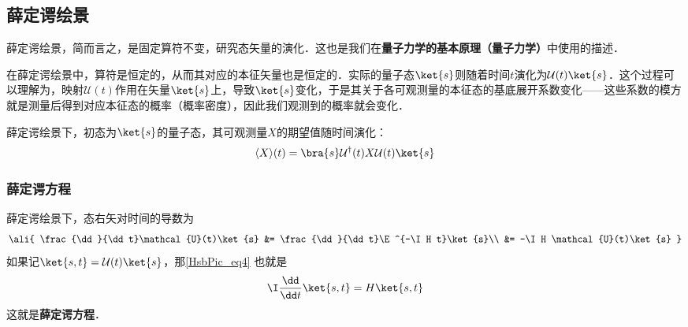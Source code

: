 
\subsection{薛定谔绘景}

薛定谔绘景，简而言之，是固定算符不变，研究态矢量的演化．这也是我们在\textbf{量子力学的基本原理（量子力学）}中使用的描述．

在薛定谔绘景中，算符是恒定的，从而其对应的本征矢量也是恒定的．实际的量子态$\ket{s}$则随着时间$t$演化为$\mathcal{U}(t)\ket{s}$．这个过程可以理解为，映射$\mathcal{U}(t)$作用在矢量$\ket{s}$上，导致$\ket{s}$变化，于是其关于各可观测量的本征态的基底展开系数变化——这些系数的模方就是测量后得到对应本征态的概率（概率密度），因此我们观测到的概率就会变化．


薛定谔绘景下，初态为$\ket{s}$的量子态，其可观测量$X$的期望值随时间演化：
\begin{equation}
\langle X \rangle(t) = \bra{s}\mathcal{U}^\dagger(t)X\mathcal{U}(t)\ket{s}
\end{equation}

\subsubsection{薛定谔方程}

薛定谔绘景下，态右矢对时间的导数为
\begin{equation}\label{HsbPic_eq4}
\ali{
    \frac{\dd}{\dd t}\mathcal{U}(t)\ket{s} &= \frac{\dd}{\dd t}\E^{-\I H t}\ket{s}\\
    &= -\I H \mathcal{U}(t)\ket{s}
}
\end{equation}
如果记$\ket{s, t}=\mathcal{U}(t)\ket{s}$，那\autoref{HsbPic_eq4} 也就是
\begin{equation}\label{HsbPic_eq5}
\I \frac{\dd}{\dd t}\ket{s, t} = H\ket{s, t}
\end{equation}
这就是\textbf{薛定谔方程}．








